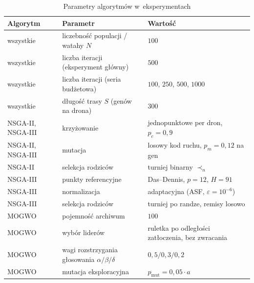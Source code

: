 \begin{table}[htbp]
    \centering
    \caption{Parametry algorytmów w~eksperymentach}
    \label{tab:parametry_algorytmow}
    \begin{tabular}{l l l}
        \hline
        \textbf{Algorytm} & \textbf{Parametr} & \textbf{Wartość} \\
        \hline
        wszystkie & liczebność populacji / watahy $N$ & $100$ \\
        wszystkie & liczba iteracji (eksperyment główny) & $500$ \\
        wszystkie & liczba iteracji (seria budżetowa) & $100$, $250$, $500$, $1000$ \\
        wszystkie & długość trasy $S$ (genów na drona) & $300$ \\
        NSGA-II, NSGA-III & krzyżowanie & jednopunktowe per dron, $p_c = 0{,}9$ \\
        NSGA-II, NSGA-III & mutacja & losowy kod ruchu, $p_m = 0{,}12$ na gen \\
        NSGA-II & selekcja rodziców & turniej binarny $\prec_n$ \\
        NSGA-III & punkty referencyjne & Das--Dennis, $p = 12$, $H = 91$ \\
        NSGA-III & normalizacja & adaptacyjna (ASF, $\varepsilon = 10^{-6}$) \\
        NSGA-III & selekcja rodziców & turniej po randze, remisy losowo \\
        MOGWO & pojemność archiwum & $100$ \\
        MOGWO & wybór liderów & ruletka po odległości zatłoczenia, bez zwracania \\
        MOGWO & wagi rozstrzygania głosowania $\alpha/\beta/\delta$ & $0{,}5 / 0{,}3 / 0{,}2$ \\
        MOGWO & mutacja eksploracyjna & $p_{\text{mut}} = 0{,}05 \cdot a$ \\
        \hline
    \end{tabular}
\end{table}

